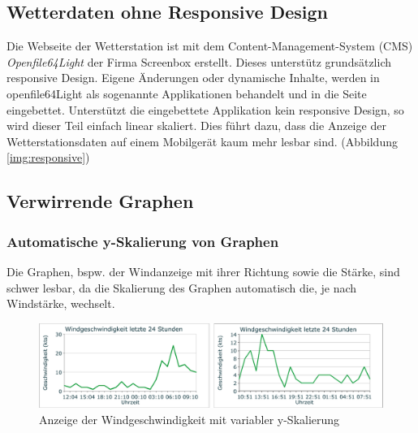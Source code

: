 \subsection{Wetterdaten ohne Responsive Design}
Die Webseite der Wetterstation ist mit dem Content-Management-System (CMS) \textit{Openfile64Light} der Firma Screenbox erstellt. Dieses unterstütz grundsätzlich responsive Design. Eigene Änderungen oder dynamische Inhalte, werden in openfile64Light als sogenannte Applikationen behandelt und in die Seite eingebettet. Unterstützt die eingebettete Applikation kein responsive Design, so wird dieser Teil einfach linear skaliert. Dies führt dazu, dass die Anzeige der Wetterstationsdaten auf einem Mobilgerät kaum mehr lesbar sind. (Abbildung \ref{img:responsive})





\subsection{Verwirrende Graphen}


\subsubsection*{Automatische y-Skalierung von Graphen}
Die Graphen, bspw. der Windanzeige mit ihrer Richtung sowie die Stärke, sind schwer lesbar, da die Skalierung des Graphen automatisch die, je nach Windstärke, wechselt.


\begin{figure}[h!]
	\centering
	\includegraphics[width=1\linewidth]{img/wind-geschw}
	\caption{Anzeige der Windgeschwindigkeit mit variabler y-Skalierung}
	\label{img:wind-geschw}
\end{figure}



